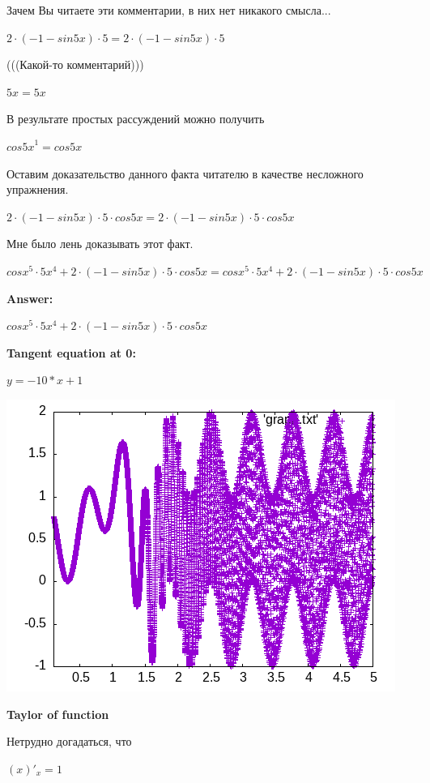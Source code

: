 \documentclass[12pt,a4paper,fleqn]{article}
\theoremstyle{definition}
\begin{document}
Зачем Вы читаете эти комментарии, в них нет никакого смысла... 

$ 2  \cdot ( -1  - sin 5  x ) \cdot  5  =  2  \cdot ( -1  - sin 5  x ) \cdot  5 $

(((Какой-то комментарий))) 

$ 5  x  =  5  x $

В результате простых рассуждений можно получить 

${cos 5  x }^{ 1 } = cos 5  x $

Оставим доказательство данного факта читателю в качестве несложного упражнения. 

$ 2  \cdot ( -1  - sin 5  x ) \cdot  5  \cdot cos 5  x  =  2  \cdot ( -1  - sin 5  x ) \cdot  5  \cdot cos 5  x $

Мне было лень доказывать этот факт.

$cos{ x }^{ 5 } \cdot  5 { x }^{ 4 } +  2  \cdot ( -1  - sin 5  x ) \cdot  5  \cdot cos 5  x  = cos{ x }^{ 5 } \cdot  5 { x }^{ 4 } +  2  \cdot ( -1  - sin 5  x ) \cdot  5  \cdot cos 5  x $


\textbf{Answer:}

$cos{ x }^{ 5 } \cdot  5 { x }^{ 4 } +  2  \cdot ( -1  - sin 5  x ) \cdot  5  \cdot cos 5  x $


\textbf{Tangent equation at 0:}

$y = -10 * x + 1$


\includegraphics{./graph.png} 



\textbf{Taylor of function}


Нетрудно догадаться, что 

$( x )'_{x} =  1 $
\end{document}
